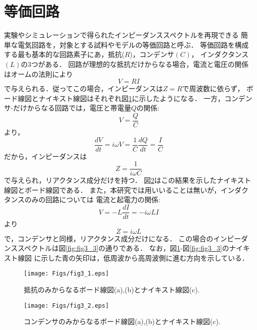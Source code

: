 \section{等価回路}
実験やシミュレーションで得られたインピーダンススペクトルを再現できる
簡単な電気回路を，対象とする試料やモデルの等価回路と呼ぶ．
等価回路を構成する最も基本的な回路素子にあ，抵抗($R$)，コンデンサ$(C)$，
インダクタンス$(L)$の3つがある．
回路が理想的な抵抗だけからなる場合，電流と電圧の関係はオームの法則により
\begin{equation}
	V=RI
	\label{eqn:Ohom}
\end{equation}
で与えられる．従ってこの場合，インピーダンスは$Z=R$で周波数に依らず，
ボード線図とナイキスト線図はそれぞれ図\ref{fig:fig3_1}に示したようになる．
一方，コンデンサ-だけからなる回路では，電圧と帯電量$Q$の関係:
\begin{equation}
	V=\frac{Q}{C}
	\label{eqn:Q_CV}
\end{equation}
より，
\begin{equation}
	\frac{dV}{dt}=i\omega V =\frac{1}{C}\frac{dQ}{dt}=\frac{I}{C}
	\label{eqn:}
\end{equation}
だから，インピーダンスは
\begin{equation}
	Z=\frac{1}{i\omega C}
	\label{eqn:Zc}
\end{equation}
で与えられ，リアクタンス成分だけを持つ．
図\ref{fig:fig3_2}はこの結果を示したナイキスト線図とボード線図である．
また，本研究では用いいることは無いが，インダクタンスのみの回路については
電流と起電力の関係:
\begin{equation}
	V=-L\frac{dI}{dt}=-i\omega LI 
	\label{eqn:}
\end{equation}
より
\begin{equation}
	Z=i\omega L
	\label{eqn:}
\end{equation}
で，コンデンサと同様，リアクタンス成分だけになる．
この場合のインピーダンススペクトルは図\ref{fig:fig3_3}の通りである．
なお，図\ref{fig:fig3_1}-図\ref{fig:fig3_3}のナイキスト線図
に示した青の矢印は，低周波から高周波側に進む方向を示している．
\begin{figure}[h]
	\begin{center}
	\texttt{[image: Figs/fig3\_1.eps]} 
	\end{center}
	\caption{
		抵抗のみからなるボード線図(a),(b)とナイキスト線図(c).
	} 
	\label{fig:fig3_1}
\end{figure}
\begin{figure}[h]
	\begin{center}
	\texttt{[image: Figs/fig3\_2.eps]} 
	\end{center}
	\caption{
		コンデンサのみからなるボード線図(a),(b)とナイキスト線図(c).
	} 
	\label{fig:fig3_2}
\end{figure}
